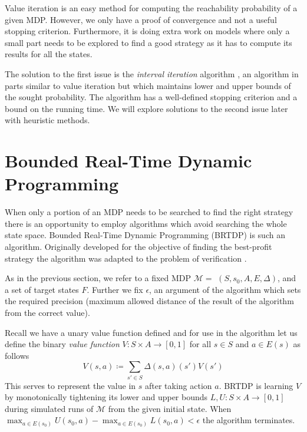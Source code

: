 Value iteration is an easy method for computing the reachability
probability of a given MDP.  However, we only have a proof of convergence
and not a useful stopping criterion.  Furthermore, it is doing extra work
on models where only a small part needs to be explored to find a good
strategy as it has to compute its results for all the states.

The solution to the first issue is the {\em interval iteration}
algorithm \parencite{interval_iteration}, an algorithm in parts similar
to value iteration but which maintains lower and upper bounds of the
sought probability. The algorithm has a well-defined stopping criterion
and a bound on the running time.  We will explore solutions to the
second issue later with heuristic methods.


\section{Bounded Real-Time Dynamic Programming}

When only a portion of an MDP needs to be searched to find the right
strategy there is an opportunity to employ algorithms which avoid
searching the whole state space. Bounded Real-Time Dynamic Programming
(BRTDP) is such an algorithm. Originally developed for
the objective of finding the best-profit strategy
\parencite{profit_brtdp} the algorithm was adapted to the problem of
verification \parencite{atva14}.

As in the previous section, we refer to a fixed MDP $\mathcal{M} =$
\linebreak $(S,s_0,A,E,\Delta)$, and a set of target states
$F$. Further we fix $\epsilon$, an argument of the algorithm which sets
the required precision (maximum allowed distance of the result of the
algorithm from the correct value).

Recall we have a unary value function defined
and for use in the algorithm let us define the binary {\em value function}
$V : S \times A \to [0,1]$ for all $s \in S$ and $a \in E(s)$ as follows
\[
    V(s,a) \coloneqq \sum_{s' \in S} \Delta(s,a)(s')V(s')
\]
This serves to represent the value in $s$ after taking action $a$.
BRTDP is learning $V$ by monotonically tightening its lower and upper
bounds $L, U : S \times A \to [0,1]$ during simulated runs of
$\mathcal{M}$ from the given initial state.
When $\max_{a \in E(s_0)} U(s_0, a) - \max_{a \in E(s_0)} L(s_0, a) < \epsilon$
the algorithm terminates.


